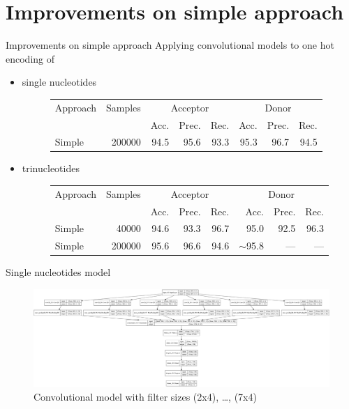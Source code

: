 \documentclass[10pt]{beamer}
\begin{document}
\section{Improvements on simple approach}
\begin{frame}{Improvements on simple approach}
	Applying convolutional models to one hot encoding of
	\begin{itemize}
		\item single nucleotides
		\begin{figure}
			\small
			\centering
			\begingroup
			\def\arraystretch{1.2}
			\begin{tabular}{|l|r|r|r|r|r|r|r|}
				\hline
				Approach  & Samples & \multicolumn{3}{c|}{Acceptor} & \multicolumn{3}{c|}{Donor} \\
				\cline{3-8}
				& & Acc. & Prec. & Rec. & Acc. & Prec. & Rec. \\
				\hline
				Simple & 200000 & 94.5 & 95.6 & 93.3 & 95.3 & 96.7 & 94.5 \\
				
				\hline  
			\end{tabular}
			\endgroup
		\end{figure}
		\item trinucleotides
		\begin{figure}
			\small
			\centering
			\begingroup
			\def\arraystretch{1.2}
			\begin{tabular}{|l|r|r|r|r|r|r|r|}
				\hline
				Approach  & Samples & \multicolumn{3}{c|}{Acceptor} & \multicolumn{3}{c|}{Donor} \\
				\cline{3-8}
				& & Acc. & Prec. & Rec. & Acc. & Prec. & Rec. \\
				\hline
				Simple & 40000 & 94.6 & 93.3 & 96.7 & 95.0 & 92.5 & 96.3 \\
				Simple & 200000 & 95.6 & 96.6 & 94.6 & $\sim$95.8 & --- & ---\\
				
				\hline  
			\end{tabular}
			\endgroup
		\end{figure}
	\end{itemize}
\end{frame}

\begin{frame}{Single nucleotides model}
	\begin{figure}[ht]
		\centering
		\includegraphics[width = 1.05\textwidth]{../../models/plotted_models/simple_model.png}
		\caption{Convolutional model with filter sizes (2x4), \dots, (7x4)}
	\end{figure}
\end{frame}
\end{document}
